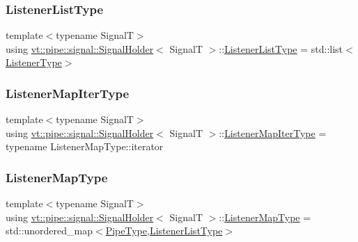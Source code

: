 \subsubsection{\texorpdfstring{Listener\+List\+Type}{ListenerListType}}
{\footnotesize\ttfamily template$<$typename SignalT$>$ \\
using \hyperlink{structvt_1_1pipe_1_1signal_1_1_signal_holder}{vt\+::pipe\+::signal\+::\+Signal\+Holder}$<$ SignalT $>$\+::\hyperlink{structvt_1_1pipe_1_1signal_1_1_signal_holder_ae37fd15e6a901de2f90620780e936f6e}{Listener\+List\+Type} =  std\+::list$<$\hyperlink{structvt_1_1pipe_1_1signal_1_1_signal_holder_a23af418129e6e8ecb4ee9621e6fd6f90}{Listener\+Type}$>$}

\mbox{\label{structvt_1_1pipe_1_1signal_1_1_signal_holder_a7f6eed09a10f9b4f679c99ae85983879}} 
\subsubsection{\texorpdfstring{Listener\+Map\+Iter\+Type}{ListenerMapIterType}}
{\footnotesize\ttfamily template$<$typename SignalT$>$ \\
using \hyperlink{structvt_1_1pipe_1_1signal_1_1_signal_holder}{vt\+::pipe\+::signal\+::\+Signal\+Holder}$<$ SignalT $>$\+::\hyperlink{structvt_1_1pipe_1_1signal_1_1_signal_holder_a7f6eed09a10f9b4f679c99ae85983879}{Listener\+Map\+Iter\+Type} =  typename Listener\+Map\+Type\+::iterator}

\mbox{\label{structvt_1_1pipe_1_1signal_1_1_signal_holder_a47bf4c2ab16e94467e6e5d3a29820276}} 
\subsubsection{\texorpdfstring{Listener\+Map\+Type}{ListenerMapType}}
{\footnotesize\ttfamily template$<$typename SignalT$>$ \\
using \hyperlink{structvt_1_1pipe_1_1signal_1_1_signal_holder}{vt\+::pipe\+::signal\+::\+Signal\+Holder}$<$ SignalT $>$\+::\hyperlink{structvt_1_1pipe_1_1signal_1_1_signal_holder_a47bf4c2ab16e94467e6e5d3a29820276}{Listener\+Map\+Type} =  std\+::unordered\+\_\+map$<$\hyperlink{namespacevt_ac9852acda74d1896f48f406cd72c7bd3}{Pipe\+Type},\hyperlink{structvt_1_1pipe_1_1signal_1_1_signal_holder_ae37fd15e6a901de2f90620780e936f6e}{Listener\+List\+Type}$>$}

